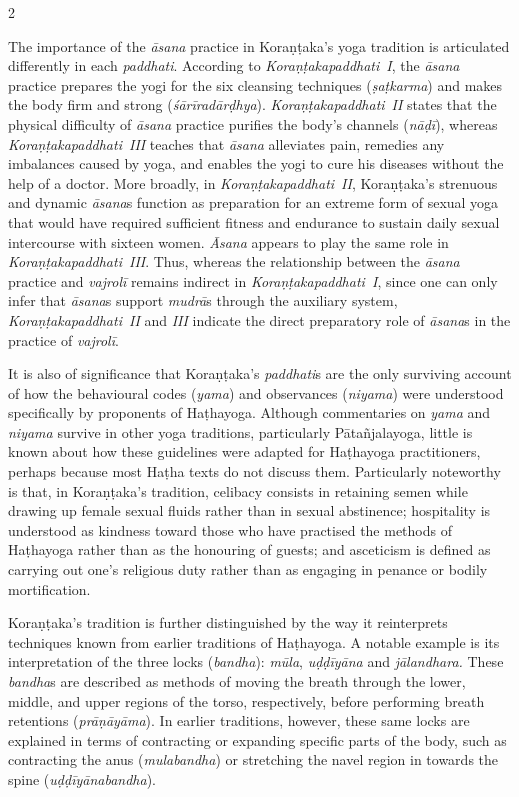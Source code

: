 \begin{nohyp}
\begin{multicols*}{2}
\begin{eng}
The importance of the \emph{āsana} practice in Koraṇṭaka's yoga tradition is articulated differently in each \emph{paddhati}. According to \emph{Koraṇṭakapaddhati}~\emph{I}, the \emph{āsana} practice prepares the yogi for the six cleansing techniques (\emph{ṣaṭkarma}) and makes the body firm and strong (\emph{śārīradārḍhya}). \emph{Koraṇṭakapaddhati}~\emph{II} states that the physical difficulty of \emph{āsana} practice purifies the body's channels (\emph{nāḍī}), whereas \emph{Koraṇṭakapaddhati}~\emph{III} teaches that \emph{āsana} alleviates pain, remedies any imbalances caused by yoga, and enables the yogi to cure his diseases without the help of a doctor. More broadly, in \emph{Koraṇṭakapaddhati}~\emph{II}, Koraṇṭaka's strenuous and dynamic \emph{āsana}s function as preparation for an extreme form of sexual yoga that would have required sufficient fitness and endurance to sustain daily sexual intercourse with sixteen women. \emph{Āsana} appears to play the same role in \emph{Koraṇṭakapaddhati}~\emph{III}. Thus, whereas the relationship between the \emph{āsana} practice and \emph{vajrolī} remains indirect in \emph{Koraṇṭakapaddhati~I}, since one can only infer that \emph{āsana}s support \emph{mudrā}s through the auxiliary system, \emph{Koraṇṭakapaddhati}~\emph{II} and \emph{III} indicate the direct preparatory role of \emph{āsana}s in the practice of \emph{vajrolī}.

It is also of significance that Koraṇṭaka's \emph{paddhati}s are the only surviving account of how the behavioural codes (\emph{yama}) and observances (\emph{niyama}) were understood specifically by proponents of Haṭhayoga. Although commentaries on \emph{yama} and \emph{niyama} survive in other yoga traditions, particularly Pātañjalayoga, little is known about how these guidelines were adapted for Haṭhayoga practitioners, perhaps because most Haṭha texts do not discuss them. Particularly noteworthy is that, in Koraṇṭaka's tradition, celibacy consists in retaining semen while drawing up female sexual fluids rather than in sexual abstinence; hospitality is understood as kindness toward those who have practised the methods of Haṭhayoga rather than as the honouring of guests; and asceticism is defined as carrying out one's religious duty rather than as engaging in penance or bodily mortification.

Koraṇṭaka's tradition is further distinguished by the way it reinterprets techniques known from earlier traditions of Haṭhayoga. A notable example is its interpretation of the three locks (\emph{bandha}): \emph{mūla}, \emph{uḍḍīyāna} and \emph{jālandhara.} These \emph{bandha}s are described as methods of moving the breath through the lower, middle, and upper regions of the torso, respectively, before performing breath retentions (\emph{prāṇāyāma}). In earlier traditions, however, these same locks are explained in terms of contracting or expanding specific parts of the body, such as contracting the anus (\emph{mulabandha}) or stretching the navel region in towards the spine (\emph{uḍḍīyānabandha}).


\end{eng}
\end{multicols*}
\end{nohyp}
